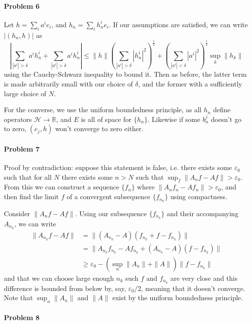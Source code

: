 \documentclass[12pt]{article}
\begin{document}
\paragraph{Problem 6}

Let $h = \sum_ia^ie_i$, and $h_n = \sum_ih_n^ie_i$. If our assumptions are
satisfied, we can write $|(h_n,h)|$ as
\begin{displaymath}
  |\sum_{|a^i|>\delta}a^ih_n^i + \sum_{|a^i|>\delta}a^ih_n^i| \leq
  \|h\|\left(\sum_{|a^i|>\delta}|h_n^i|^2\right)^{\frac{1}{2}} +
  \left(\sum_{|a^i|<\delta}|a^i|^2\right)^{\frac{1}{2}}\sup_k\|h_k\|
\end{displaymath}
using the Cauchy-Schwarz inequality to bound it. Then as before, the latter
term is made arbitrarily small with our choice of $\delta$, and the former
with a sufficiently large choice of $N$.

For the converse, we use the uniform boundedness principle, as all $h_n$ define
operators $\mathcal{H}\to \mathbb{R}$, and $E$ is all of space for $\{h_n\}$.
Likewise if some $b^j_n$ doesn't go to zero, $(e_j,h)$ won't converge to zero
either.

\paragraph{Problem 7}

Proof by contradiction: suppose this statement is false, i.e. there exists
some $\varepsilon_0$ such that for all $N$ there exists some $n>N$ such that
$\sup_f\|A_nf-Af\| > \varepsilon_0$. From this we can construct a sequence
$\{f_n\}$ where $\|A_nf_n - Af_n\|> \varepsilon_0$, and then find the limit
$f$ of a convergent subsequence $\{f_{n_k}\}$ using compactness.

Consider $\|A_nf-Af\|$. Using our subsequence $\{f_{n_k}\}$ and their
accompanying $A_{n_k}$, we can write
\begin{align*}
  \|A_{n_k}f - Af\|
  &= \|(A_{n_k}-A)(f_{n_k} + f - f_{n_k})\|\\
  &= \|A_{n_k}f_{n_k}-Af_{n_k} + (A_{n_k}-A)(f-f_{n_k})\|\\
  &\geq \varepsilon_0 - (\sup_n\|A_{n}\|+\|A\|)\|f-f_{n_k}\|
\end{align*}
and that we can choose large enough $n_k$ such $f$ and $f_{n_k}$ are very close
and this difference is bounded from
below by, say, $\varepsilon_0/2$, meaning that it doesn't converge. Note that
$\sup_n\|A_n\|$ and $\|A\|$ exist by the uniform boundedness principle.

\paragraph{Problem 8}
\end{document}
